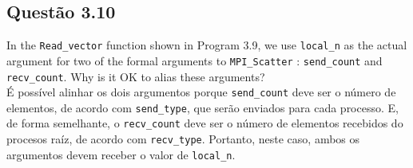 

\subsection{Questão 3.10}

In the \texttt{Read\_vector} function shown in Program 3.9, we use \texttt{local\_n} as the actual argument for two of the formal arguments to \texttt{MPI\_Scatter} : \texttt{send\_count} and \texttt{recv\_count}. Why is it OK to alias these arguments?\\

É possível alinhar os dois argumentos porque \texttt{send\_count} deve ser o número de elementos, de acordo com \texttt{send\_type}, que serão enviados para cada processo. E, de forma semelhante, o \texttt{recv\_count} deve ser o número de elementos recebidos do procesos raíz, de acordo com \texttt{recv\_type}. Portanto, neste caso, ambos os argumentos devem receber o valor de \texttt{local\_n}.
